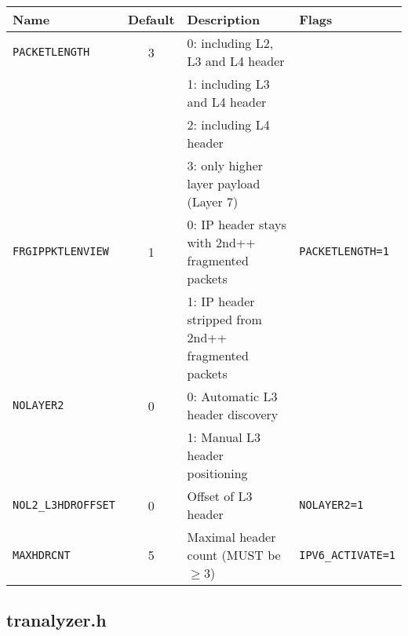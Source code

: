 \begin{longtable}{lcll}
    \toprule
    {\bf Name} & {\bf Default} & {\bf Description} & {\bf Flags}\\
    \midrule\endhead%
    {\tt PACKETLENGTH}      & 3 & 0: including L2, L3 and L4 header\\
                            &   & 1: including L3 and L4 header\\
                            &   & 2: including L4 header\\
                            &   & 3: only higher layer payload (Layer 7)\\
    {\tt FRGIPPKTLENVIEW}   & 1 & 0: IP header stays with 2nd++ fragmented packets & {\tt PACKETLENGTH=1}\\
                            &   & 1: IP header stripped from 2nd++ fragmented packets\\
    {\tt NOLAYER2}          & 0 & 0: Automatic L3 header discovery\\
                            &   & 1: Manual L3 header positioning\\
    {\tt NOL2\_L3HDROFFSET} & 0 & Offset of L3 header & {\tt NOLAYER2=1}\\
    {\tt MAXHDRCNT}         & 5 & Maximal header count (MUST be $\geq 3$)& {\tt IPV6\_ACTIVATE=1}\\
    \bottomrule
\end{longtable}

\subsection{tranalyzer.h}\label{tranalyzer.h}

